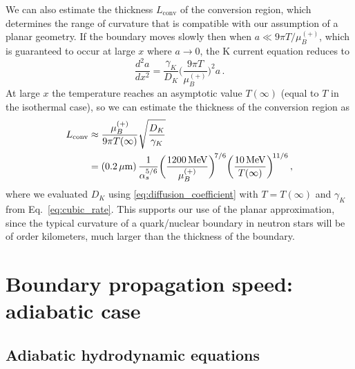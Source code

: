 \documentclass[10pt,superscriptaddress,
amsmath,aps,prc,twocolumn,nofootinbib,floatfix]{revtex4-1}
\newcommand{\al}{\alpha}
\newcommand{\ga}{\gamma}
\newcommand{\m}{\text{m}}
\newcommand{\MeV}{\text{MeV}}
\begin{document}
We can also estimate the thickness $L_{\text{conv}}$ of the conversion region, which determines the range of curvature that is compatible with our assumption of a planar geometry.
If the boundary moves slowly then when $a \ll 9\pi T/\mu_B^{(+)}$, which is guaranteed to occur at large $x$ where $a\to 0$, the K current equation reduces to
\begin{equation}
    \dfrac{d^2 a}{dx^2} =
    \dfrac{\ga_K}{D_K}\biggl(\dfrac{9\pi T}{\mu_B^{(+)}}\biggr)^{\!2} a \,.
\end{equation}
At large $x$ the temperature reaches an asymptotic value $T(\infty)$ (equal to $T$ in the isothermal case), so we can estimate the thickness of the conversion region as
\begin{align}
    L_{\text{conv}} &\approx \dfrac{\mu_B^{(+)}}{9\pi T(\infty)}\sqrt{\dfrac{D_K}{\ga_K}} \notag\\
    &= (0.2\,\mu\m)\,\dfrac{1}{\al_s^{5/6}}
    \biggl(\dfrac{1200\,\MeV}{\mu_B^{(+)}}\biggr)^{\!7/6}
     \biggl(\dfrac{10\,\MeV}{T(\infty)}\biggr)^{\!11/6}
    \,, \label{eq:conversion-thickness}
\end{align}
where we evaluated $D_K$ using \eqref{eq:diffusion_coefficient} with $T=T(\infty)$ and $\gamma_K$ from Eq.~\eqref{eq:cubic_rate}.
This supports our use of the planar approximation, since the typical curvature of a quark/nuclear boundary in neutron stars will be of order kilometers, much larger than the thickness of the boundary.

\section{Boundary propagation speed: adiabatic case}
\label{sec:speed-adiabatic}


\subsection{Adiabatic hydrodynamic equations}
\label{sec:adiabatic-equations}
\end{document}
